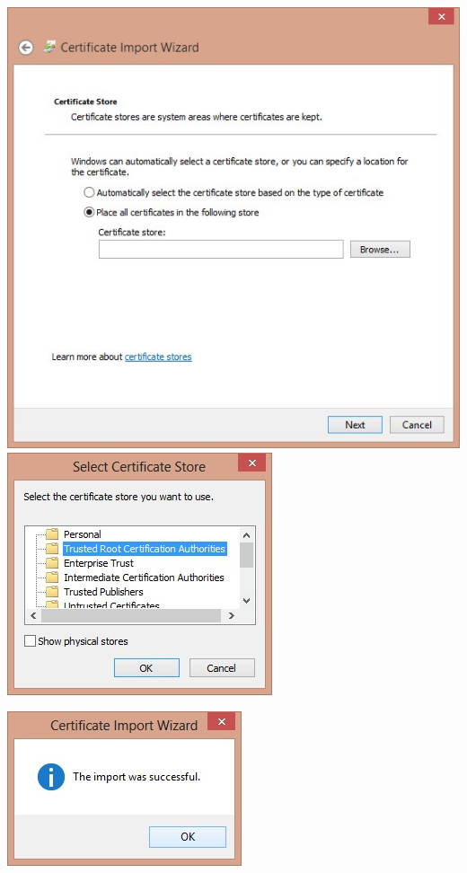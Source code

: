 \documentclass[12pt,a4paper,landscape]{article}
\begin{document}
\begin{CJK}{UTF8}{gbsn}
\includegraphics[scale=1]{pic/005-1.jpg}
\includegraphics[scale=1]{pic/005-2.jpg}

\includegraphics[scale=1]{pic/006.jpg}



\newpage


\end{CJK}
\end{document}
